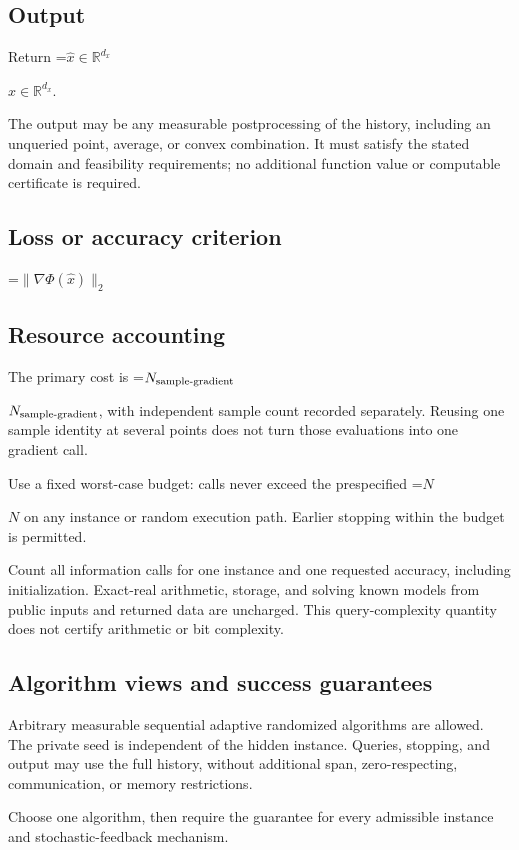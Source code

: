 \documentclass[10pt,a4paper]{article}
\newcommand{\AtlasMath}[1]{\par\begingroup\centering\setbox0=\hbox{$\displaystyle #1$}\ifdim\wd0>1.4\linewidth\typeout{ATLAS WIDE FORMULA: \the\wd0}\fi\ifdim\wd0>\linewidth\resizebox{\linewidth}{!}{\box0}\else\box0\fi\par\endgroup}
\newcommand{\AtlasInlineMath}[1]{\begingroup\setbox0=\hbox{$#1$}\ifdim\wd0>.4\linewidth\endgroup\AtlasMath{#1}\else\endgroup$#1$\fi}
\begin{document}
\subsection{Output}
Return \AtlasInlineMath{\widehat x\in\mathbb R^{d_x}}.

The output may be any measurable postprocessing of the history, including an unqueried point, average, or convex combination. It must satisfy the stated domain and feasibility requirements; no additional function value or computable certificate is required.

\subsection{Loss or accuracy criterion}

\AtlasMath{\|\nabla\Phi(\widehat{x})\|_2}


\subsection{Resource accounting}
The primary cost is \AtlasInlineMath{N_{\rm sample\text{-}gradient}}, with independent sample count recorded separately. Reusing one sample identity at several points does not turn those evaluations into one gradient call.

Use a fixed worst-case budget: calls never exceed the prespecified \AtlasInlineMath{N} on any instance or random execution path. Earlier stopping within the budget is permitted.

Count all information calls for one instance and one requested accuracy, including initialization. Exact-real arithmetic, storage, and solving known models from public inputs and returned data are uncharged. This query-complexity quantity does not certify arithmetic or bit complexity.

\subsection{Algorithm views and success guarantees}
Arbitrary measurable sequential adaptive randomized algorithms are allowed. The private seed is independent of the hidden instance. Queries, stopping, and output may use the full history, without additional span, zero-respecting, communication, or memory restrictions.

Choose one algorithm, then require the guarantee for every admissible instance and stochastic-feedback mechanism.
\end{document}

